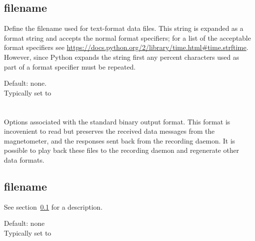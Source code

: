 \subsection{filename}
\label{sec:config-data-filename}
Define the filename used for text-format data files. This string is
expanded as a  format string and accepts the normal
 format specifiers; for a list of the acceptable format
specifiers see
\url{https://docs.python.org/2/library/time.html#time.strftime}. However,
since Python expands the string first any percent characters used as
part of a  format specifier must be repeated.

Default: none.\\
Typically set to 


\section{\code{[awpacket]}}
Options associated with the standard binary output format. This format
is incovenient to read but preserves the received data messages from
the magnetometer, and the responses sent back from the recording
daemon. It is possible to play back these files to the recording
daemon and regenerate other data formats.

\subsection{filename}

See section~\ref{sec:config-data-filename} for a description.

Default: none\\
Typically set to 

